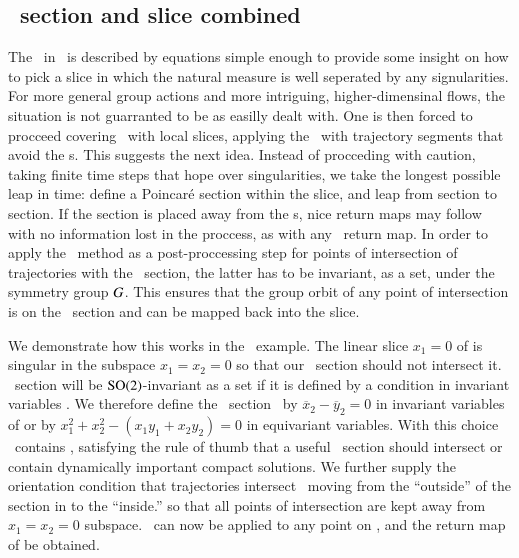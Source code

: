 \subsection{\label{s:laserMFnum}\Poincare\ section and slice combined}


The \sset\ in \cLe\ is described by equations simple enough to
provide some insight on how to pick a slice in which the natural 
measure is well seperated by any signularities. For more general
group actions and more intriguing, higher-dimensinal flows, 
the situation is not guarranted to be as easilly dealt with.
One is then forced to procceed covering \statesp\ with local slices,
applying the \mframes\ with trajectory segments that avoid the {\sset s}. 
This suggests the next idea.
Instead of procceding with caution, taking finite time steps that
hope over singularities, we take the longest possible
leap in time: define a Poincar\'e section within the slice,
and leap from section to section. If the section is placed away from the
{\sset s}, nice return maps may follow with no
information lost in the proccess, as with any \Poincare\ return map. 
In order to apply the \mframes\ method as a post-proccessing step 
for points of intersection of trajectories with the \Poincare\ section, 
the latter has to be invariant, as a set, under the symmetry group $G$.
This ensures that the group orbit of any point of intersection
is on the \Poincare\ section and can be mapped back 
into the slice. 

We demonstrate how this works in the \cLe\ example. The linear slice $x_1=0$ of
 is singular in the subspace
$x_1=x_2=0$ so that our \Poincare\ section should not intersect it.
\Poincare\ section will be $\textrm{SO}(2)$-invariant as a set if it is defined by a condition 
in invariant variables . We therefore define the 
\Poincare\ section  \PoincS\ by $\overline{x}_2-\overline{y}_2=0$ 
in invariant variables of  or by $x_1^2+x_2^2-(x_1 y_1 + x_2 y_2)=0$
in equivariant variables. With this choice \PoincS\ contains ,
satisfying the rule of thumb that a useful  \Poincare\ section should 
intersect or contain dynamically important compact solutions.
We further supply the orientation condition that trajectories intersect \PoincS\ moving from the
``outside'' of the section in  to the
``inside.'' so that all points of intersection are kept away from $x_1=x_2=0$
subspace. \Mframes\ can now be applied to any point on \PoincS,
and the return map of  be obtained.


